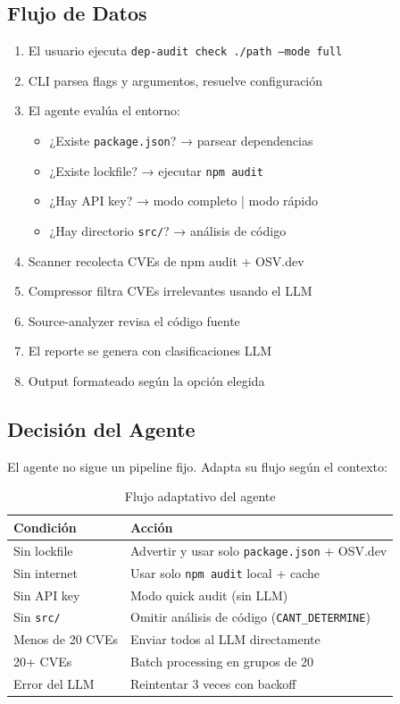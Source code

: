 \documentclass[11pt,a4paper]{article}
\begin{document}
\subsection{Flujo de Datos}

\begin{enumerate}
  \item El usuario ejecuta \texttt{dep-audit check ./path --mode full}
  \item CLI parsea flags y argumentos, resuelve configuración
  \item El agente evalúa el entorno:
    \begin{itemize}
      \item ¿Existe \texttt{package.json}? → parsear dependencias
      \item ¿Existe lockfile? → ejecutar \texttt{npm audit}
      \item ¿Hay API key? → modo completo | modo rápido
      \item ¿Hay directorio \texttt{src/}? → análisis de código
    \end{itemize}
  \item Scanner recolecta CVEs de npm audit + OSV.dev
  \item Compressor filtra CVEs irrelevantes usando el LLM
  \item Source-analyzer revisa el código fuente
  \item El reporte se genera con clasificaciones LLM
  \item Output formateado según la opción elegida
\end{enumerate}

\subsection{Decisión del Agente}

El agente no sigue un pipeline fijo. Adapta su flujo según el contexto:

\begin{table}[H]
  \centering
  \caption{Flujo adaptativo del agente}
  \begin{tabularx}{\textwidth}{l X}
    \toprule
    \textbf{Condición} & \textbf{Acción} \\
    \midrule
    Sin lockfile & Advertir y usar solo \texttt{package.json} + OSV.dev \\
    Sin internet & Usar solo \texttt{npm audit} local + cache \\
    Sin API key & Modo quick audit (sin LLM) \\
    Sin \texttt{src/} & Omitir análisis de código (\texttt{CANT\_DETERMINE}) \\
    Menos de 20 CVEs & Enviar todos al LLM directamente \\
    20+ CVEs & Batch processing en grupos de 20 \\
    Error del LLM & Reintentar 3 veces con backoff \\
    \bottomrule
  \end{tabularx}
\end{table}
\end{document}
